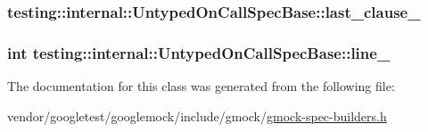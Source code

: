 \subsubsection[{\texorpdfstring{last\+\_\+clause\+\_\+}{last_clause_}}]{ testing\+::internal\+::\+Untyped\+On\+Call\+Spec\+Base\+::last\+\_\+clause\+\_\+\hspace{0.3cm}{\ttfamily [protected]}}\hypertarget{classtesting_1_1internal_1_1UntypedOnCallSpecBase_adb6d19adfeb5fde535d854aedbc5fb0f}{}\label{classtesting_1_1internal_1_1UntypedOnCallSpecBase_adb6d19adfeb5fde535d854aedbc5fb0f}
\subsubsection[{\texorpdfstring{line\+\_\+}{line_}}]{\setlength{\rightskip}{0pt plus 5cm}int testing\+::internal\+::\+Untyped\+On\+Call\+Spec\+Base\+::line\+\_\+\hspace{0.3cm}{\ttfamily [protected]}}\hypertarget{classtesting_1_1internal_1_1UntypedOnCallSpecBase_a1dfa0dafaae6697f17adf5d837ca77c7}{}\label{classtesting_1_1internal_1_1UntypedOnCallSpecBase_a1dfa0dafaae6697f17adf5d837ca77c7}


The documentation for this class was generated from the following file\+:\begin{DoxyCompactItemize}
\item 
vendor/googletest/googlemock/include/gmock/\hyperlink{gmock-spec-builders_8h}{gmock-\/spec-\/builders.\+h}\end{DoxyCompactItemize}
